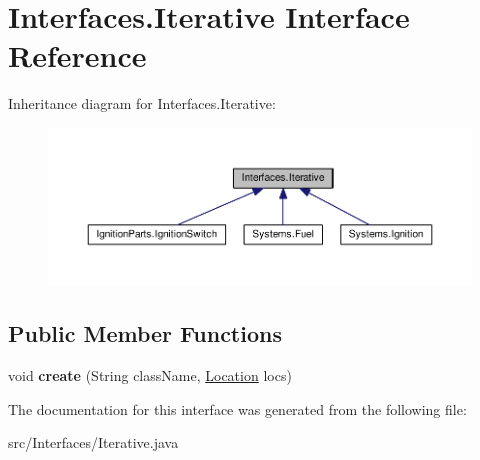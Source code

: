 \hypertarget{interfaceInterfaces_1_1Iterative}{}\section{Interfaces.\+Iterative Interface Reference}
\label{interfaceInterfaces_1_1Iterative}


Inheritance diagram for Interfaces.\+Iterative\+:\nopagebreak
\begin{figure}[H]
\begin{center}
\leavevmode
\includegraphics[width=350pt]{interfaceInterfaces_1_1Iterative__inherit__graph}
\end{center}
\end{figure}
\subsection*{Public Member Functions}
\begin{DoxyCompactItemize}
\item 
\hypertarget{interfaceInterfaces_1_1Iterative_a41e96d137f26a38b06cbbb79695bb96d}{}void {\bfseries create} (String class\+Name, \hyperlink{enumEnums_1_1Location}{Location} locs)\label{interfaceInterfaces_1_1Iterative_a41e96d137f26a38b06cbbb79695bb96d}

\end{DoxyCompactItemize}


The documentation for this interface was generated from the following file\+:\begin{DoxyCompactItemize}
\item 
src/\+Interfaces/Iterative.\+java\end{DoxyCompactItemize}
